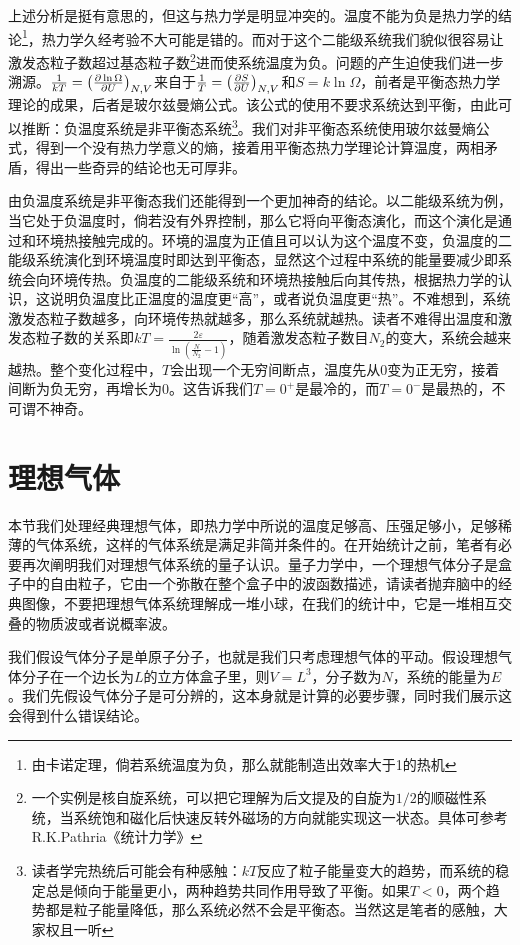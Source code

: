 \documentclass[../../main.tex]{subfiles}
\begin{document}
上述分析是挺有意思的，但这与热力学是明显冲突的。温度不能为负是热力学的结论\footnote{由卡诺定理，倘若系统温度为负，那么就能制造出效率大于1的热机}，热力学久经考验不大可能是错的。而对于这个二能级系统我们貌似很容易让激发态粒子数超过基态粒子数\footnote{一个实例是核自旋系统，可以把它理解为后文提及的自旋为\(1/2\)的顺磁性系统，当系统饱和磁化后快速反转外磁场的方向就能实现这一状态。具体可参考R.K.Pathria《统计力学》}进而使系统温度为负。问题的产生迫使我们进一步溯源。\(\frac{1}{kT}=\left(\pdv{\ln \Omega}{U}\right)_{N,V}\)来自于\(\frac{1}{T}=\left(\pdv{S}{U}\right)_{N,V}\)和\(S=k\ln\Omega\)，前者是平衡态热力学理论的成果，后者是玻尔兹曼熵公式。该公式的使用不要求系统达到平衡，由此可以推断：负温度系统是非平衡态系统\footnote{读者学完热统后可能会有种感触：\(kT\)反应了粒子能量变大的趋势，而系统的稳定总是倾向于能量更小，两种趋势共同作用导致了平衡。如果\(T<0\)，两个趋势都是粒子能量降低，那么系统必然不会是平衡态。当然这是笔者的感触，大家权且一听}。我们对非平衡态系统使用玻尔兹曼熵公式，得到一个没有热力学意义的熵，接着用平衡态热力学理论计算温度，两相矛盾，得出一些奇异的结论也无可厚非。

由负温度系统是非平衡态我们还能得到一个更加神奇的结论。以二能级系统为例，当它处于负温度时，倘若没有外界控制，那么它将向平衡态演化，而这个演化是通过和环境热接触完成的。环境的温度为正值且可以认为这个温度不变，负温度的二能级系统演化到环境温度时即达到平衡态，显然这个过程中系统的能量要减少即系统会向环境传热。负温度的二能级系统和环境热接触后向其传热，根据热力学的认识，这说明负温度比正温度的温度更“高”，或者说负温度更“热”。不难想到，系统激发态粒子数越多，向环境传热就越多，那么系统就越热。读者不难得出温度和激发态粒子数的关系即\(kT=\frac{2\varepsilon}{\ln(\frac{N}{N_2}-1)}\)，随着激发态粒子数目\(N_2\)的变大，系统会越来越热。整个变化过程中，\(T\)会出现一个无穷间断点，温度先从0变为正无穷，接着间断为负无穷，再增长为0。这告诉我们\(T=0^+\)是最冷的，而\(T=0^-\)是最热的，不可谓不神奇。


\section{理想气体}

本节我们处理经典理想气体，即热力学中所说的温度足够高、压强足够小，足够稀薄的气体系统，这样的气体系统是满足非简并条件的。在开始统计之前，笔者有必要再次阐明我们对理想气体系统的量子认识。量子力学中，一个理想气体分子是盒子中的自由粒子，它由一个弥散在整个盒子中的波函数描述，请读者抛弃脑中的经典图像，不要把理想气体系统理解成一堆小球，在我们的统计中，它是一堆相互交叠的物质波或者说概率波。

我们假设气体分子是单原子分子，也就是我们只考虑理想气体的平动。假设理想气体分子在一个边长为\(L\)的立方体盒子里，则\(V=L^3\)，分子数为\(N\)，系统的能量为\(E\)。我们先假设气体分子是可分辨的，这本身就是计算的必要步骤，同时我们展示这会得到什么错误结论。
\end{document}
